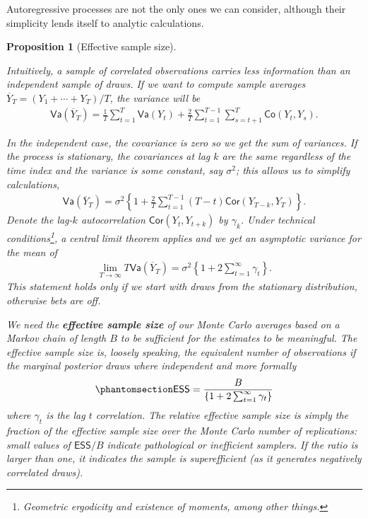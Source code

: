 \documentclass[
  11pt,
  letterpaper,
]{scrbook}
\theoremstyle{definition}
\theoremstyle{plain}
\newtheorem{proposition}{Proposition}[chapter]
\theoremstyle{plain}
\theoremstyle{definition}
\theoremstyle{definition}
\theoremstyle{remark}
\begin{document}
Autoregressive processes are not the only ones we can consider, although
their simplicity lends itself to analytic calculations.

\begin{proposition}[Effective sample
size]\protect\hypertarget{prp-variance-clt}{}\label{prp-variance-clt}

Intuitively, a sample of correlated observations carries less
information than an independent sample of draws. If we want to compute
sample averages \(\overline{Y}_T=(Y_1+ \cdots + Y_T)/T\), the variance
will be \begin{align*}
\mathsf{Va}\left(\overline{Y}_T\right) = \frac{1}{T}\sum_{t=1}^T \mathsf{Va}(Y_t) + \frac{2}{T} \sum_{t=1}^{T-1}\sum_{s = t+1}^T \mathsf{Co}(Y_t, Y_s).
\end{align*}

In the independent case, the covariance is zero so we get the sum of
variances. If the process is stationary, the covariances at lag \(k\)
are the same regardless of the time index and the variance is some
constant, say \(\sigma^2\); this allows us to simplify calculations,
\begin{align*}
\mathsf{Va}(\overline{Y}_T) = \sigma^2 \left\{ 1 + \frac{2}{T}\sum_{t=1}^{T-1} (T-t) \mathsf{Cor}(Y_{T-k}, Y_{T})\right\}.
\end{align*} Denote the lag-\(k\) autocorrelation
\(\mathsf{Cor}(Y_{t}, Y_{t+k})\) by \(\gamma_k\). Under technical
conditions\footnote{Geometric ergodicity and existence of moments, among
  other things.}, a central limit theorem applies and we get an
asymptotic variance for the mean of \begin{align*}
\lim_{T \to \infty} T\mathsf{Va}\left(\overline{Y}_T\right) = \sigma^2 \left\{1+2\sum_{t=1}^\infty \gamma_t\right\}.
\end{align*} This statement holds only if we start with draws from the
stationary distribution, otherwise bets are off.

We need the \textbf{effective sample size} of our Monte Carlo averages
based on a Markov chain of length \(B\) to be sufficient for the
estimates to be meaningful. The effective sample size is, loosely
speaking, the equivalent number of observations if the marginal
posterior draws where independent and more formally
\begin{equation}\phantomsection\label{eq-effective-sample-size}{
\mathsf{ESS} = \frac{B}{\left\{1+2\sum_{t=1}^\infty \gamma_t\right\}}
}\end{equation} where \(\gamma_t\) is the lag \(t\) correlation. The
relative effective sample size is simply the fraction of the effective
sample size over the Monte Carlo number of replications: small values of
\(\mathsf{ESS}/B\) indicate pathological or inefficient samplers. If the
ratio is larger than one, it indicates the sample is superefficient (as
it generates negatively correlated draws).


\end{proposition}
\end{document}
